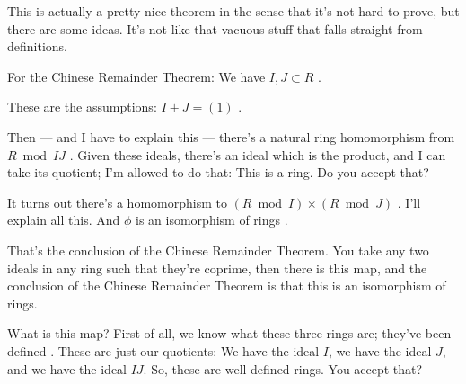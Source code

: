 \begin{speech}[01:18:15 - 01:19:50]
This is actually a pretty nice theorem in the sense that it's not hard to prove, but there are some ideas. It's not like that vacuous stuff that falls straight from definitions.

For the Chinese Remainder Theorem: We have $I, J \subset R$ .

These are the assumptions: $I + J = (1)$ .

Then --- and I have to explain this --- there's a natural ring homomorphism from $R \bmod IJ$ . Given these ideals, there's an ideal which is the product, and I can take its quotient; I'm allowed to do that: This is a ring. Do you accept that?

It turns out there's a homomorphism to $(R \bmod I) \times (R \bmod J)$ . I'll explain all this. And $\phi$ is an isomorphism of rings .

That's the conclusion of the Chinese Remainder Theorem. You take any two ideals in any ring such that they're coprime, then there is this map, and the conclusion of the Chinese Remainder Theorem is that this is an isomorphism of rings.

What is this map? First of all, we know what these three rings are; they've been defined . These are just our quotients: We have the ideal $I$, we have the ideal $J$, and we have the ideal $IJ$. So, these are well-defined rings. You accept that?
\end{speech}

\begin{content}
\end{content}

